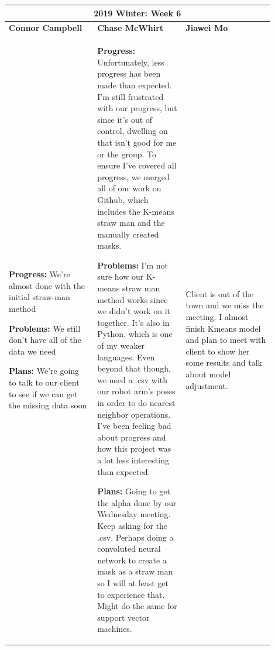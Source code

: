 \documentclass[10pt,journal,compsoc, draftclsnofoot,onecolumn]{IEEEtran}
\begin{document}
\begin{center}
\begin{tabular}{|p{0.3\linewidth}|p{0.3\linewidth}|p{0.3\linewidth}|}
\hline
\multicolumn{3}{|c|}{\textbf{2019 Winter: Week 6}} \\
\hline
\textbf{Connor Campbell} & \textbf{Chase McWhirt} & \textbf{Jiawei Mo} \\ [0.5ex]
\hline\hline

\textbf{Progress:} We're almost done with the initial straw-man method

\textbf{Problems:} We still don't have all of the data we need

\textbf{Plans:} We're going to talk to our client to see if we can get the missing data soon
&
\textbf{Progress:} Unfortunately, less progress has been made than expected.
I'm still frustrated with our progress, but since it's out of control, dwelling on that isn't good for me or the group.
To ensure I've covered all progress, we merged all of our work on Github, which includes the K-means straw man and the manually created masks.

\textbf{Problems:} I'm not sure how our K-means straw man method works since we didn't work on it together.
It's also in Python, which is one of my weaker languages.
Even beyond that though, we need a .csv with our robot arm's poses in order to do nearest neighbor operations.
I've been feeling bad about progress and how this project was a lot less interesting than expected.

\textbf{Plans:} Going to get the alpha done by our Wednesday meeting.
Keep asking for the .csv.
Perhaps doing a convoluted neural network to create a mask as a straw man so I will at least get to experience that.
Might do the same for support vector machines.
&
Client is out of the town and we miss the meeting. I almost finish Kmeans model and plan to meet with client to show her some results and talk about model adjustment. 
\\ \hline
\end{tabular}
\end{center}
\end{document}

